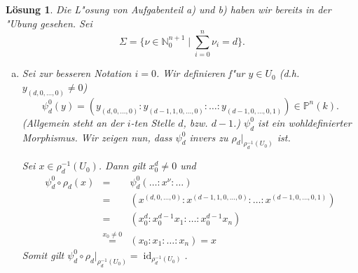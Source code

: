 \documentclass[a4paper, 12pt, numbers=noendperiod, chapterprefix=true, headsepline]{scrbook}
\theoremstyle{break}
\newtheorem{Loes}{L\"osung}
\theoremstyle{nonumberbreak}
\theoremstyle{nonumberplain}
\newcommand{\set}[2]{\{#1\mid #2\}} %
\DeclareMathOperator{\id}{id}
\newcommand{\N}{\mathbb{N}}
\newcommand{\IP}{\mathbb{P}}%
\begin{document}
\begin{Loes}
Die L"osung von Aufgabenteil a) und b) haben wir bereits in der "Ubung gesehen. Sei
	\[\Sigma = \set{\nu \in \N_0^{n+1}}{\sum_{i=0}^n \nu_i = d}.\]
\begin{enumerate}[a)]
\item[c)]
	Sei zur besseren Notation $i=0$. Wir definieren f"ur $y\in U_0$ (d.h. $y_{(d,0,\dots,0)} \neq 0$)
		\[\psi_d^0(y) = (y_{(d,0,\dots,0)}: y_{(d-1,1,0,\dots,0)} : \ldots : y_{(d-1,0,\dots,0,1)}) \in \IP^n(k).\]
	(Allgemein steht an der $i$-ten Stelle $d$, bzw. $d-1$.) $\psi_d^0$ ist ein wohldefinierter Morphismus. Wir zeigen nun, dass $\psi_d^0$ invers zu $\rho_d|_{\rho_d^{-1}(U_0)}$ ist. 

	Sei $x\in \rho_d^{-1}(U_0)$. Dann gilt $x_0^d\neq 0$ und 
	\begin{eqnarray*}
		\psi_d^0 \circ \rho_d(x) &=& \psi_d^0(\ldots : x^\nu : \ldots)\\
		&=& (x^{(d,0,\dots,0)} : x^{(d-1,1,0,\dots,0)}: \dots : x^{(d-1,0,\dots,0,1)})\\
		&=& (x_0^d: x_0^{d-1}x_1: \ldots : x_0^{d-1}x_n)\\
		&\stackrel{x_0 \neq 0}{=}& (x_0 : x_1: \ldots : x_n) = x
	\end{eqnarray*}
	Somit gilt $\psi_d^0\circ \rho_d|_{\rho_d^{-1}(U_0)} = \id_{\rho_d^{-1}(U_0)}$.


\end{enumerate}
\end{Loes}
\end{document}
